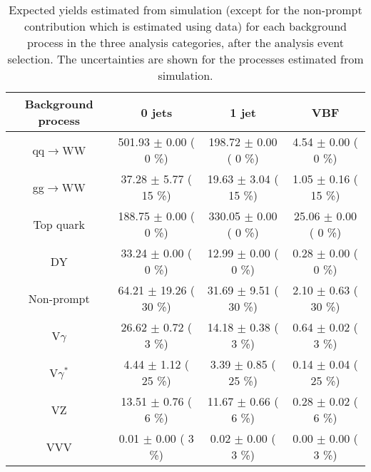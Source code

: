 \begin{table}[h!]\begin{center}
\caption{Expected yields estimated from simulation (except for the non-prompt contribution which is estimated using data) for each background process in the three analysis categories, after the analysis event selection. The uncertainties are shown for the processes estimated from simulation.}\label{tab:bkg_yields}
\small{\begin{tabular}{c c c c }
\toprule
             Background process           &         0 jets                                          &          1 jet                                         &        VBF                                           \\
\midrule
      qq$\to$WW                &    501.93 $\pm$       0.00 (         0 \%)              &     198.72 $\pm$       0.00 (         0 \%)             &      4.54 $\pm$       0.00 (         0 \%)               \\
      gg$\to$WW                &     37.28 $\pm$       5.77 (        15 \%)              &      19.63 $\pm$       3.04 (        15 \%)             &      1.05 $\pm$       0.16 (        15 \%)               \\
      Top quark                &    188.75 $\pm$       0.00 (         0 \%)              &     330.05 $\pm$       0.00 (         0 \%)             &     25.06 $\pm$       0.00 (         0 \%)               \\
      DY                &     33.24 $\pm$       0.00 (         0 \%)              &      12.99 $\pm$       0.00 (         0 \%)             &      0.28 $\pm$       0.00 (         0 \%)               \\
      Non-prompt                &     64.21 $\pm$      19.26 (        30 \%)              &      31.69 $\pm$       9.51 (        30 \%)             &      2.10 $\pm$       0.63 (        30 \%)               \\
      V$\gamma$                &     26.62 $\pm$       0.72 (         3 \%)              &      14.18 $\pm$       0.38 (         3 \%)             &      0.64 $\pm$       0.02 (         3 \%)               \\
     V$\gamma^*$                &      4.44 $\pm$       1.12 (        25 \%)              &       3.39 $\pm$       0.85 (        25 \%)             &      0.14 $\pm$       0.04 (        25 \%)               \\
     VZ                &     13.51 $\pm$       0.76 (         6 \%)              &      11.67 $\pm$       0.66 (         6 \%)             &      0.28 $\pm$       0.02 (         6 \%)               \\
     VVV                &      0.01 $\pm$       0.00 (         3 \%)              &       0.02 $\pm$       0.00 (         3 \%)             &      0.00 $\pm$       0.00 (         3 \%)               \\   
     

\end{tabular}}
\end{center}
\end{table}
